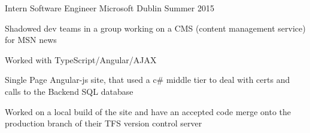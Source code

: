 

\begin{cventries}

  \cventry
    {Intern Software Engineer} %
    {Microsoft} %
    {Dublin} %
    {Summer 2015} %
    {
      \begin{cvitems} %
        \item {Shadowed dev teams in a group working on a CMS (content management service) for MSN news}
        \item {Worked with TypeScript/Angular/AJAX}
        \item {Single Page Angular-js site, that used a c\# middle tier to deal with certs and calls to the Backend SQL database}
        \item {Worked on a local build of the site and have an accepted code merge onto the production branch of their TFS version control server}
      \end{cvitems}
    }



\end{cventries}

